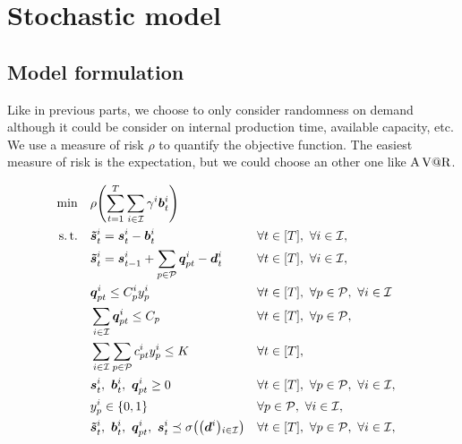 \section{Stochastic model}

\subsection{Model formulation}

Like in previous parts, we choose to only consider randomness on demand although it could be consider on internal production time, available capacity, etc.
We use a measure of risk $\rho$ to quantify the objective function.
The easiest measure of risk is the expectation, but we could choose an other one like $\operatorname{A\operatorname{V@R}}$.

\begin{subequations}\label{eq:stochastic multi-sourcing:limited capital}
  \begin{align}
    \min\quad & \rlap{$\ds \rho\bracket{\sum_{t=1}^{\horizon} \sum_{i\in\REF} \backorder^i \va\backlog_t^i}$}
    \label{eq:stochastic multi-sourcing:limited capital:objective}
    \\
    \st\quad & \ds \va\level_t^i = \va\inventory_t^i - \va\backlog_t^i && \forall t\in\range{\horizon},\ \forall i\in\REF,
    \label{eq:stochastic multi-sourcing:limited capital:inventory}
    \\
    & \ds \va\level_t^i = \va\inventory_{t-1}^i + \sum_{p\in\plants}\va\quantity_{pt}^i - \va\demand_t^i && \forall t\in\range{\horizon},\ \forall i\in\REF,
    \label{eq:stochastic multi-sourcing:limited capital:dynamic}
    \\
    & \ds \va\quantity_{pt}^i \le \capacity_p^i \open_p^i && \forall t\in\range{\horizon},\ \forall p\in\plants,\ \forall i\in\REF
    \label{eq:stochastic multi-sourcing:limited capital:big M}
    \\
    & \ds \sum_{i\in\REF}\va\quantity_{pt}^i \le \capacity_p && \forall t\in\range{\horizon},\ \forall p\in\plants,
    \label{eq:stochastic multi-sourcing:limited capital:capacity}
    \\
    & \ds \sum_{i\in\REF} \sum_{p\in\plants}\affect_{pt}^i\open_p^i \le \capital && \forall t\in\range{\horizon},
    \label{eq:stochastic multi-sourcing:limited capital:capital}
    \\
    & \ds \va\inventory_t^i,\ \va\backlog_t^i,\ \va\quantity_{pt}^i \ge 0 && \forall t\in\range{\horizon},\ \forall p\in\plants,\ \forall i\in\REF,
    \label{eq:stochastic multi-sourcing:limited capital:nonnegativity}
    \\
    & \ds \open_p^i \in \crbracket{0,1} && \forall p\in\plants,\ \forall i\in\REF,
    \label{eq:stochastic multi-sourcing:limited capital:binary}
    \\
    & \ds \va\level_t^i,\ \va\backlog_t^i,\ \va\quantity_{pt}^i,\ \va\inventory_t^i \preceq \Sfield{\bracket{\va\demand^i}_{i\in\REF}} && \forall t\in\range{\horizon},\ \forall p\in\plants,\ \forall i\in\REF,
    \label{eq:stochastic multi-sourcing:limited capital:non-anticipation}
  \end{align}
\end{subequations}

